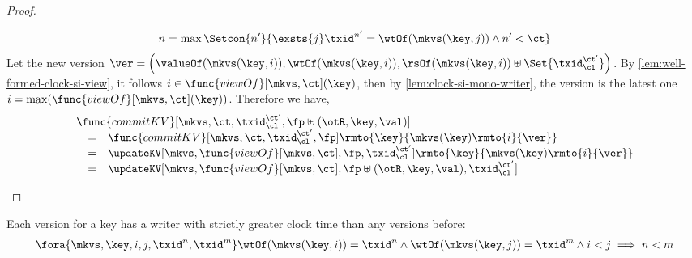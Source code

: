 \begin{proof}
\begin{itemize}
            \[
                n = \max\Setcon{n'}{%
                    \exsts{j} 
                    \txid^{n'} = \wtOf(\mkvs(\key, j)) 
                    \land n' < \ct%
                } 
            \]
            Let the new version \( \ver = \left( \valueOf(\mkvs(\key,i)), \wtOf(\mkvs(\key,i)), \rsOf(\mkvs(\key,i)) \uplus \Set{\txid_\cl^{\ct'}} \right) \).
            By \cref{lem:well-formed-clock-si-view}, it follows \( i \in \func{viewOf}[\mkvs,\ct](\key) \), then by \cref{lem:clock-si-mono-writer}, the version is the latest one \( i = \max(\func{viewOf}[\mkvs,\ct](\key)) \).
            Therefore we have,
            \[
                \begin{array}{@{}l@{}}
                \func{commitKV}[\mkvs,\ct,\txid_\cl^{\ct'},\fp \uplus (\otR, \key, \val)]  \\
                \quad \begin{array}[t]{@{}c l@{}}
                = &
                \func{commitKV}[\mkvs,\ct,\txid_\cl^{\ct'},\fp]\rmto{\key}{\mkvs(\key)\rmto{i}{\ver}} \\
                = & 
                \updateKV[\mkvs,\func{viewOf}[\mkvs,\ct],\fp,\txid_\cl^{\ct'}]\rmto{\key}{\mkvs(\key)\rmto{i}{\ver}} \\
                = & 
                \updateKV[\mkvs,\func{viewOf}[\mkvs,\ct],\fp \uplus (\otR, \key, \val),\txid_\cl^{\ct'}]
                \end{array}
                \end{array}
            \]
    \end{itemize}
\end{proof}

\begin{lemma}
    \label{lem:clock-si-mono-writer}
    Each version for a key has a writer with strictly greater clock time than any versions before:
    \[
        \begin{array}{@{}l@{}}
            \fora{\mkvs,\key,i,j,\txid^n,\txid^m} 
            \wtOf(\mkvs(\key,i)) = \txid^n 
            \land \wtOf(\mkvs(\key,j)) = \txid^m 
            \land i < j
            \implies 
            n < m
        \end{array}
    \]
\end{lemma}

